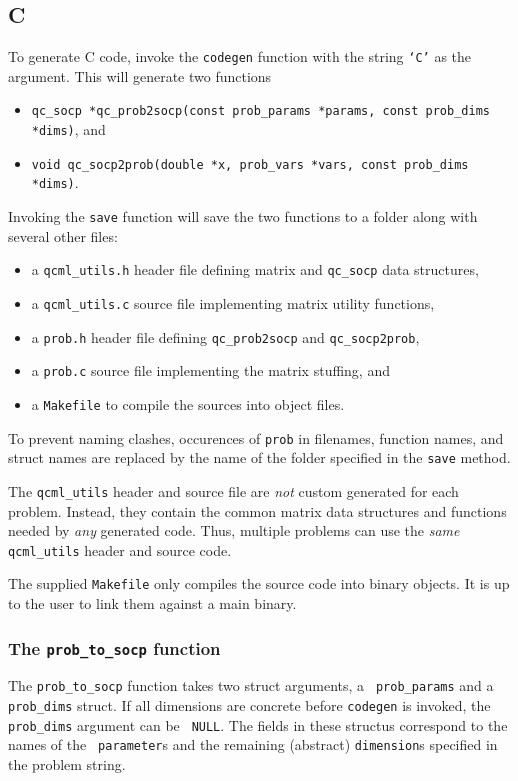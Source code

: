 \documentclass[11pt]{article}
\begin{document}
\subsection{C}
To generate C code, invoke the {\tt codegen} function with the string
{\tt `C'} as the argument. This will generate two functions
\begin{itemize}
\item {\tt qc\_socp *qc\_prob2socp(const prob\_params *params, const prob\_dims *dims)}, and
\item {\tt void qc\_socp2prob(double *x, prob\_vars *vars, const prob\_dims *dims)}.
\end{itemize}
Invoking the {\tt save} function will save the two functions to a folder along
with several other files:
\begin{itemize}
  \item a {\tt qcml\_utils.h} header file defining matrix and {\tt qc\_socp} data structures,
  \item a {\tt qcml\_utils.c} source file implementing matrix utility functions,
  \item a {\tt prob.h} header file defining {\tt qc\_prob2socp} and {\tt qc\_socp2prob},
  \item a {\tt prob.c} source file implementing the matrix stuffing, and
  \item a {\tt Makefile} to compile the sources into object files.
\end{itemize}
To prevent naming clashes, occurences of {\tt prob} in filenames, function
names, and struct names are replaced by the name of the folder specified in
the {\tt save} method.

The {\tt qcml\_utils} header and source file are \emph{not} custom generated
for each problem. Instead, they contain the common matrix data structures and
functions needed by \emph{any} generated code. Thus, multiple problems can
use the \emph{same} {\tt qcml\_utils} header and source code.

The supplied {\tt Makefile} only compiles the source code into binary objects.
It is up to the user to link them against a main binary.


\subsubsection{The {\tt prob\_to\_socp} function}
The {\tt prob\_to\_socp} function takes two struct arguments, a {\tt
prob\_params} and a {\tt prob\_dims} struct. If all dimensions are concrete
before {\tt codegen} is invoked, the {\tt prob\_dims} argument can be {\tt
NULL}. The fields in these structus correspond to the names of the {\tt
parameter}s and the remaining (abstract) {\tt dimension}s specified in the
problem string.
\end{document}
